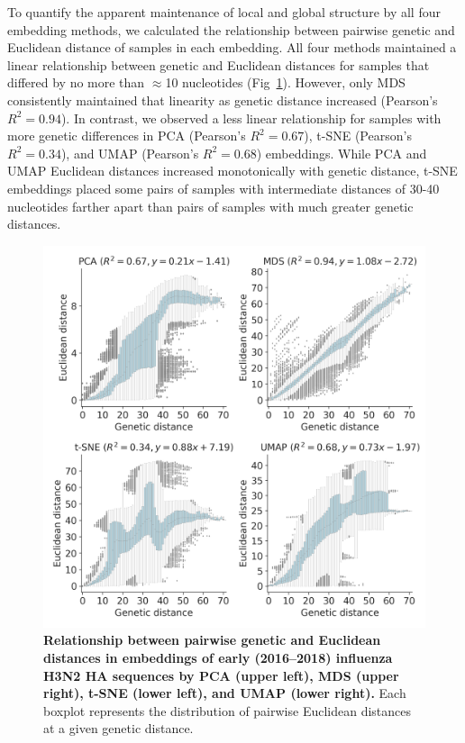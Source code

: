 \documentclass[10pt,letterpaper]{article}
\begin{document}
To quantify the apparent maintenance of local and global structure by all four embedding methods, we calculated the relationship between pairwise genetic and Euclidean distance of samples in each embedding.
All four methods maintained a linear relationship between genetic and Euclidean distances for samples that differed by no more than $\approx$10 nucleotides (Fig~\ref{fig:seasonal-influenza-h3n2-ha-pairwise-distances}).
However, only MDS consistently maintained that linearity as genetic distance increased (Pearson's $R^{2} = 0.94$).
In contrast, we observed a less linear relationship for samples with more genetic differences in PCA (Pearson's $R^{2} = 0.67$), t-SNE (Pearson's $R^{2} = 0.34$), and UMAP (Pearson's $R^{2} = 0.68$) embeddings.
While PCA and UMAP Euclidean distances increased monotonically with genetic distance, t-SNE embeddings placed some pairs of samples with intermediate distances of 30-40 nucleotides farther apart than pairs of samples with much greater genetic distances.

\begin{figure}[!h]
\includegraphics[width=\columnwidth]{figures/flu-2016-2018-ha-euclidean-distance-by-genetic-distance.png}
\caption{{\bf Relationship between pairwise genetic and Euclidean distances in embeddings of early (2016--2018) influenza H3N2 HA sequences by PCA (upper left), MDS (upper right), t-SNE (lower left), and UMAP (lower right).}
  Each boxplot represents the distribution of pairwise Euclidean distances at a given genetic distance.
}
\label{fig:seasonal-influenza-h3n2-ha-pairwise-distances}
\end{figure}
\end{document}
